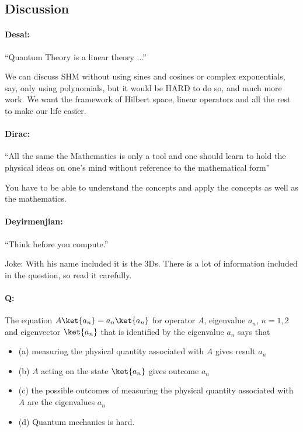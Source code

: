 %
%

\subsection{Discussion}

\paragraph{Desai:} ``Quantum Theory is a linear theory ...''

We can discuss SHM without using sines and cosines or complex exponentials, say, only using polynomials, but it would be HARD to do so, and much more work.  We want the framework of Hilbert space, linear operators and all the rest to make our life easier.

\paragraph{Dirac:} ``All the same the Mathematics is only a tool and one should learn to hold the physical ideas on one's mind without reference to the mathematical form''

You have to be able to understand the concepts and apply the concepts as well as the mathematics.

\paragraph{Deyirmenjian:} ``Think before you compute.''

Joke: With his name included it is the 3Ds.  There is a lot of information included in the question, so read it carefully.

\paragraph{Q:} The equation $A \ket{a_n} = a_n \ket{a_n}$ for operator $A$, eigenvalue $a_n$, $n = 1,2$ and eigenvector $\ket{a_n}$ that is identified by the eigenvalue $a_n$ says that

\begin{itemize}
\item (a) measuring the physical quantity associated with $A$ gives result $a_n$
\item (b) $A$ acting on the state $\ket{a_n}$ gives outcome $a_n$
\item (c) the possible outcomes of measuring the physical quantity associated with $A$ are the eigenvalues $a_n$
\item (d) Quantum mechanics is hard.
\end{itemize}

